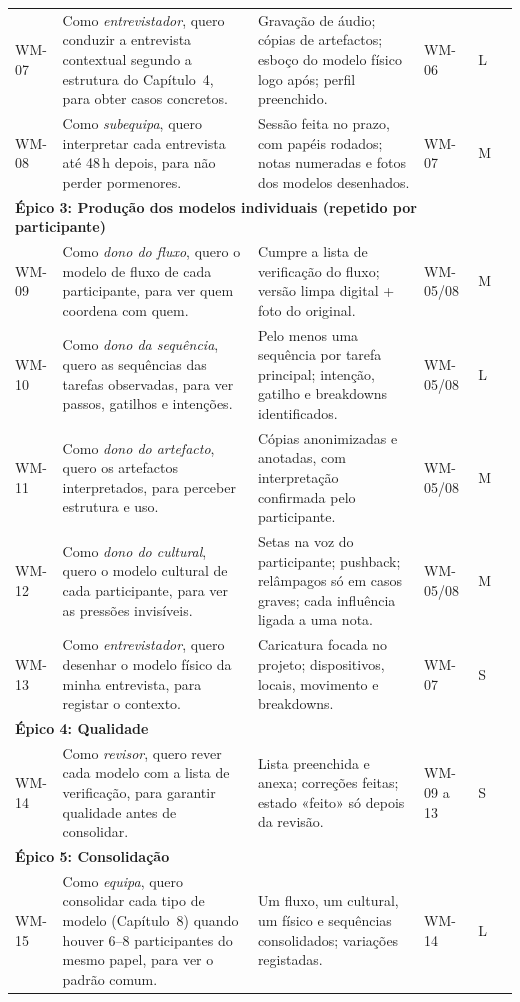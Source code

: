 \documentclass[11pt,a4paper]{article}
\begin{document}
\begin{landscape}
{\begin{longtable}{@{}p{1.2cm}p{7.0cm}p{9.2cm}p{1.2cm}p{0.9cm}p{1.8cm}@{}}
WM-07 & Como \emph{entrevistador}, quero conduzir a entrevista contextual segundo a estrutura do Capítulo~4, para obter casos concretos. & Gravação de áudio; cópias de artefactos; esboço do modelo físico logo após; perfil preenchido. & WM-06 & L & \\
WM-08 & Como \emph{subequipa}, quero interpretar cada entrevista até 48\,h depois, para não perder pormenores. & Sessão feita no prazo, com papéis rodados; notas numeradas e fotos dos modelos desenhados. & WM-07 & M & \\
\midrule
\multicolumn{6}{l}{\textbf{Épico 3: Produção dos modelos individuais (repetido por participante)}}\\
WM-09 & Como \emph{dono do fluxo}, quero o modelo de fluxo de cada participante, para ver quem coordena com quem. & Cumpre a lista de verificação do fluxo; versão limpa digital + foto do original. & WM-05/08 & M & \\
WM-10 & Como \emph{dono da sequência}, quero as sequências das tarefas observadas, para ver passos, gatilhos e intenções. & Pelo menos uma sequência por tarefa principal; intenção, gatilho e breakdowns identificados. & WM-05/08 & L & \\
WM-11 & Como \emph{dono do artefacto}, quero os artefactos interpretados, para perceber estrutura e uso. & Cópias anonimizadas e anotadas, com interpretação confirmada pelo participante. & WM-05/08 & M & \\
WM-12 & Como \emph{dono do cultural}, quero o modelo cultural de cada participante, para ver as pressões invisíveis. & Setas na voz do participante; pushback; relâmpagos só em casos graves; cada influência ligada a uma nota. & WM-05/08 & M & \\
WM-13 & Como \emph{entrevistador}, quero desenhar o modelo físico da minha entrevista, para registar o contexto. & Caricatura focada no projeto; dispositivos, locais, movimento e breakdowns. & WM-07 & S & \\
\midrule
\multicolumn{6}{l}{\textbf{Épico 4: Qualidade}}\\
WM-14 & Como \emph{revisor}, quero rever cada modelo com a lista de verificação, para garantir qualidade antes de consolidar. & Lista preenchida e anexa; correções feitas; estado «feito» só depois da revisão. & WM-09 a 13 & S & \\
\midrule
\multicolumn{6}{l}{\textbf{Épico 5: Consolidação}}\\
WM-15 & Como \emph{equipa}, quero consolidar cada tipo de modelo (Capítulo~8) quando houver 6--8 participantes do mesmo papel, para ver o padrão comum. & Um fluxo, um cultural, um físico e sequências consolidados; variações registadas. & WM-14 & L & \\
\bottomrule
\end{longtable}
}

\end{landscape}
\end{document}
